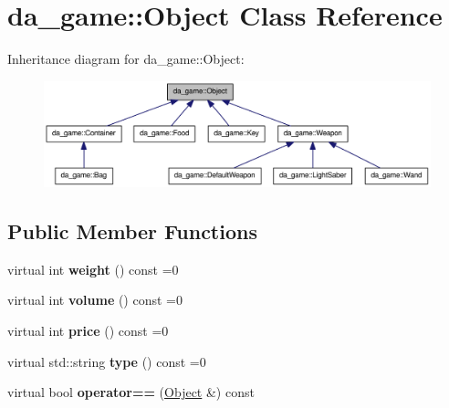 \hypertarget{classda__game_1_1Object}{
\section{da\_\-game::Object Class Reference}
\label{classda__game_1_1Object}
}
Inheritance diagram for da\_\-game::Object:\nopagebreak
\begin{figure}[H]
\begin{center}
\leavevmode
\includegraphics[width=400pt]{classda__game_1_1Object__inherit__graph}
\end{center}
\end{figure}
\subsection*{Public Member Functions}
\begin{DoxyCompactItemize}
\item 
\hypertarget{classda__game_1_1Object_af8bc16da0544770ea56f9fc4b60d2d7a}{
virtual int {\bfseries weight} () const =0}
\label{classda__game_1_1Object_af8bc16da0544770ea56f9fc4b60d2d7a}

\item 
\hypertarget{classda__game_1_1Object_a725094f0008c07a674acf3eb042d457e}{
virtual int {\bfseries volume} () const =0}
\label{classda__game_1_1Object_a725094f0008c07a674acf3eb042d457e}

\item 
\hypertarget{classda__game_1_1Object_a8ffadf9d43a195e7ac69b80963833a4d}{
virtual int {\bfseries price} () const =0}
\label{classda__game_1_1Object_a8ffadf9d43a195e7ac69b80963833a4d}

\item 
\hypertarget{classda__game_1_1Object_a2571d77aaf04c5be1f6556c4c7bab0d2}{
virtual std::string {\bfseries type} () const =0}
\label{classda__game_1_1Object_a2571d77aaf04c5be1f6556c4c7bab0d2}

\item 
\hypertarget{classda__game_1_1Object_a73b5e428218a64db3e84df9f016352c2}{
virtual bool {\bfseries operator==} (\hyperlink{classda__game_1_1Object}{Object} \&) const }
\label{classda__game_1_1Object_a73b5e428218a64db3e84df9f016352c2}

\end{DoxyCompactItemize}
